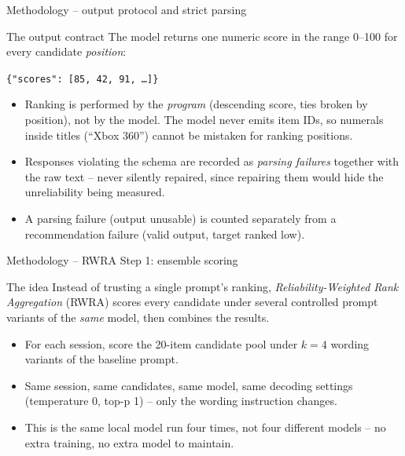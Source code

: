 \documentclass[aspectratio=169,12pt]{beamer}
\newcommand{\code}[1]{\texttt{\footnotesize #1}}
\begin{document}
\begin{frame}{Methodology -- output protocol and strict parsing}
\begin{block}{The output contract}
The model returns one numeric score in the range 0--100 for every
candidate \emph{position}:
\vspace{0.3em}
\centerline{\code{\{"scores": [85, 42, 91, \ldots]\}}}
\end{block}

\vspace{0.5em}
\begin{itemize}
  \item Ranking is performed by the \emph{program} (descending score, ties
        broken by position), not by the model. The model never emits item
        IDs, so numerals inside titles (``Xbox 360'') cannot be mistaken
        for ranking positions.
  \item Responses violating the schema are recorded as \emph{parsing
        failures} together with the raw text -- never silently repaired,
        since repairing them would hide the unreliability being measured.
  \item A parsing failure (output unusable) is counted separately from a
        recommendation failure (valid output, target ranked low).
\end{itemize}
\end{frame}

\begin{frame}{Methodology -- RWRA Step 1: ensemble scoring}
\begin{block}{The idea}
Instead of trusting a single prompt's ranking, \emph{Reliability-Weighted
Rank Aggregation} (RWRA) scores every candidate under several controlled
prompt variants of the \emph{same} model, then combines the results.
\end{block}

\vspace{0.7em}
\begin{itemize}
  \item For each session, score the 20-item candidate pool under $k{=}4$
        wording variants of the baseline prompt.
  \item Same session, same candidates, same model, same decoding settings
        (temperature 0, top-p 1) -- only the wording instruction changes.
  \item This is the same local model run four times, not four different
        models -- no extra training, no extra model to maintain.
\end{itemize}
\end{frame}
\end{document}
